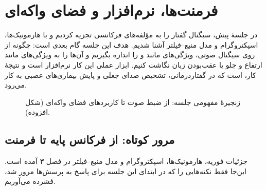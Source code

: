 \chapter{فرمنت‌ها، نرم‌افزار  و فضای واکه‌ای}

در جلسهٔ پیش، سیگنال گفتار را به مؤلفه‌های فرکانسی تجزیه کردیم و با هارمونیک‌ها، اسپکتروگرام و مدل منبع–فیلتر آشنا شدیم. هدف این جلسه گام بعدی است: چگونه از روی سیگنال صوتی، ویژگی‌های  مانند  و  را اندازه بگیریم و آن‌ها را به ویژگی‌های  مانند ارتفاع و جلو یا عقب‌بودن زبان نگاشت کنیم. ابزار عملی این کار نرم‌افزار  است و نتیجهٔ کار،  است که در گفتاردرمانی، تشخیص صدای جعلی و پایش بیماری‌های عصبی به کار می‌رود.

\begin{figure}[htbp]
\centering
{}
\caption{زنجیرهٔ مفهومی جلسه: از ضبط صوت تا کاربردهای فضای واکه‌ای (شکل افزوده).}
\end{figure}

\section{مرور کوتاه: از فرکانس پایه تا فرمنت}
جزئیات فوریه، هارمونیک‌ها، اسپکتروگرام و مدل منبع–فیلتر در فصل ۳ آمده است. این‌جا فقط نکته‌هایی را که در ابتدای این جلسه برای پاسخ به پرسش‌ها مرور شد، فشرده می‌آوریم.

